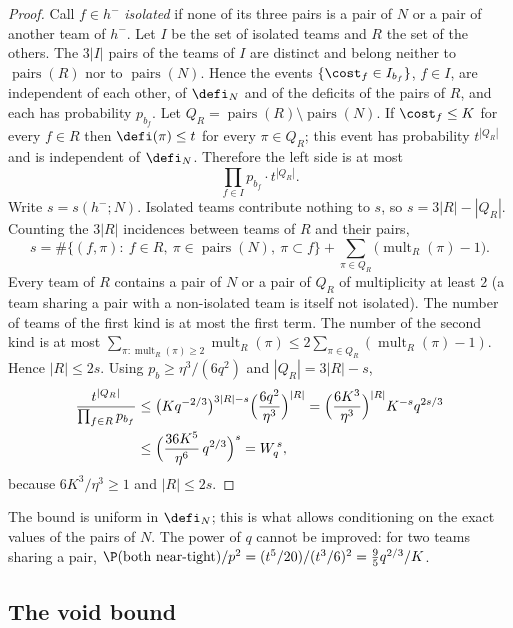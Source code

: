 \begin{proof}
Call $f\in h^-$ \emph{isolated} if none of its three pairs is a pair of $N$ or a pair of
another team of $h^-$. Let $I$ be the set of isolated teams and $R$ the set of the others. The
$3|I|$ pairs of the teams of $I$ are distinct and belong neither to
$\operatorname{pairs}(R)$ nor to $\operatorname{pairs}(N)$. Hence the events
$\{\cost_f\in I_{b_f}\}$, $f\in I$, are independent of each other, of $\defi_N$ and of the
deficits of the pairs of $R$, and each has probability $p_{b_f}$. Let
$Q_R=\operatorname{pairs}(R)\setminus\operatorname{pairs}(N)$. If $\cost_f\le K$ for every
$f\in R$ then $\defi(\pi)\le t$ for every $\pi\in Q_R$; this event has probability
$t^{|Q_R|}$ and is independent of $\defi_N$. Therefore the left side is at most
\[
\prod_{f\in I}p_{b_f}\cdot t^{|Q_R|}.
\]
Write $s=s(h^-;N)$. Isolated teams contribute nothing to $s$, so $s=3|R|-|Q_R|$. Counting the
$3|R|$ incidences between teams of $R$ and their pairs,
\[
s=\#\bigl\{(f,\pi):\ f\in R,\ \pi\in\operatorname{pairs}(N),\ \pi\subset f\bigr\}
+\sum_{\pi\in Q_R}\bigl(\operatorname{mult}_R(\pi)-1\bigr).
\]
Every team of $R$ contains a pair of $N$ or a pair of $Q_R$ of multiplicity at least $2$ (a
team sharing a pair with a non-isolated team is itself not isolated). The number of teams of
the first kind is at most the first term. The number of the second kind is at most
$\sum_{\pi:\operatorname{mult}_R(\pi)\ge2}\operatorname{mult}_R(\pi)\le
2\sum_{\pi\in Q_R}(\operatorname{mult}_R(\pi)-1)$. Hence $|R|\le2s$. Using
$p_b\ge\eta^3/(6q^2)$ and $|Q_R|=3|R|-s$,
\begin{align*}
\frac{t^{|Q_R|}}{\prod_{f\in R}p_{b_f}}
&\le\bigl(Kq^{-2/3}\bigr)^{3|R|-s}\Bigl(\frac{6q^2}{\eta^3}\Bigr)^{|R|}
=\Bigl(\frac{6K^3}{\eta^3}\Bigr)^{|R|}K^{-s}q^{2s/3}\\
&\le\Bigl(\frac{36K^5}{\eta^6}\,q^{2/3}\Bigr)^{s}=W_q^{\,s},
\end{align*}
because $6K^3/\eta^3\ge1$ and $|R|\le2s$.
\end{proof}

The bound is uniform in $\defi_N$; this is what allows conditioning on the exact values of the
pairs of $N$. The power of $q$ cannot be improved: for two teams sharing a pair,
$\P(\text{both near-tight})/p^2=(t^5/20)/(t^3/6)^2=\tfrac95q^{2/3}/K$.

\subsection{The void bound}\label{sec:transfer-void}


